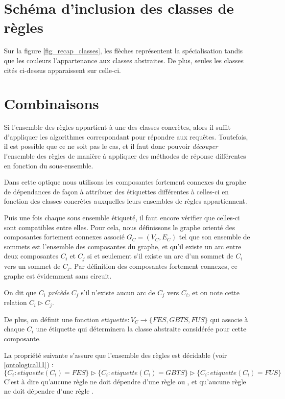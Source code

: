 

\section{Schéma d'inclusion des classes de règles}
Sur la figure \ref{fig_recap_classes}, les flèches représentent la spécialisation tandis
que les couleurs l'appartenance aux classes abstraites. De plus, seules les classes cités
ci-dessus apparaissent sur celle-ci.


\section{Combinaisons}\label{combine}
Si l'ensemble des règles appartient à une des classes concrètes, alors il suffit
d'appliquer les algorithmes correspondant pour répondre aux requêtes. Toutefois, il est
possible que ce ne soit pas le cas, et il faut donc pouvoir {\em découper} l'ensemble des
règles de manière à appliquer des méthodes de réponse différentes en fonction du
sous-ensemble.

Dans cette optique nous utilisons les composantes fortement connexes du graphe de
dépendances
de façon à attribuer des étiquettes différentes à celles-ci en fonction
des classes concrètes auxquelles leurs ensembles de règles appartiennent.

Puis une fois chaque sous ensemble étiqueté, il faut encore vérifier que celles-ci
sont compatibles entre elles.
Pour cela, nous définissons le graphe orienté des composantes fortement connexes associé
$G_{C} = (V_C,E_C)$
tel que son ensemble de sommets est l'ensemble des composantes du graphe, et
qu'il existe un arc entre deux composantes $C_i$ et $C_j$ si et seulement s'il existe un
arc d'un sommet de $C_i$ vers un sommet de $C_j$.
Par définition des composantes fortement connexes, ce graphe est évidemment sans
circuit.

On dit que $C_i$ {\em précède} $C_j$ s'il n'existe aucun arc de $C_j$ vers $C_i$, et on
note cette relation $C_i \triangleright C_j$.

De plus, on définit une fonction $etiquette : V_C \rightarrow \{FES,GBTS,FUS\}$ qui
associe à chaque $C_i$ une étiquette qui déterminera la classe abstraite considérée pour
cette composante.

La propriété suivante s'assure que l'ensemble des règles est décidable (voir
\ref{ontological11}) :
$\{C_i : etiquette(C_i) = FES\} \triangleright \{C_i : etiquette(C_i) = GBTS\} \triangleright
\{C_i : etiquette(C_i) = FUS\}$
C'est à dire qu'aucune règle \fes ne doit dépendre d'une règle \fus ou \gbts, et
qu'aucune règle \gbts ne doit dépendre d'une règle \fus.

